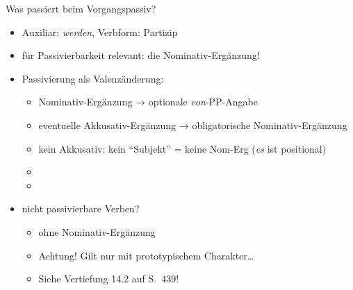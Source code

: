 \begin{frame}
\begin{exe}
\begin{xlist}
      \end{xlist}
      \pause
      \ex\label{ex:werdenpassivundverbtypen128}
      \begin{xlist}\addtolength\itemsep{-0.5\baselineskip}
      \end{xlist}
    \end{exe}
\end{frame}

\begin{frame}
  {Was passiert beim Vorgangspassiv?}
  \pause
  \begin{itemize}[<+->]
    \item Auxiliar: \textit{werden}, Verbform: Partizip
    \item für Passivierbarkeit relevant: \alert{die Nominativ-Ergänzung!}
      \Halbzeile
    \item \alert{Passivierung als Valenzänderung}:
      \begin{itemize}[<+->]
        \item Nominativ-Ergänzung → optionale \textit{von}-PP-Angabe
        \item eventuelle Akkusativ-Ergänzung → obligatorische Nominativ-Ergänzung
        \item kein Akkusativ: kein "`Subjekt"' = keine Nom-Erg (\textit{es} ist positional)
        \item {}
        \item {}
      \end{itemize}
    \Halbzeile
  \item \alert{nicht passivierbare Verben}?
    \begin{itemize}[<+->]
      \item {ohne }\alert{ Nominativ-Ergänzung}
      \item Achtung! Gilt nur mit prototypischem Charakter\ldots
      \item Siehe Vertiefung 14.2 auf S.~439!
    \end{itemize}
  \end{itemize}
\end{frame}

